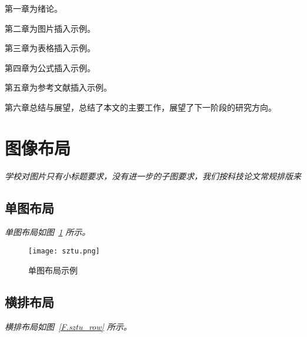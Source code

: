 第一章为绪论。

第二章为图片插入示例。

第三章为表格插入示例。

第四章为公式插入示例。

第五章为参考文献插入示例。

第六章总结与展望，总结了本文的主要工作，展望了下一阶段的研究方向。


\section{图像布局}
\label{sec.figure}

\emph{学校对图片只有小标题要求，没有进一步的子图要求，我们按科技论文常规排版来}

\subsection{单图布局}

\lipsum

\emph{单图布局如图~\ref{F.sztu_single} 所示。}

\begin{figure}[hbt]
\centering
\texttt{[image: sztu.png]}
\caption{单图布局示例}
\label{F.sztu_single}
\end{figure}

\subsection{横排布局}

\emph{横排布局如图~\ref{F.sztu_row} 所示。}

